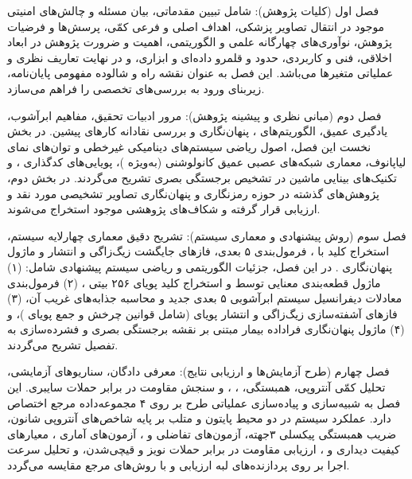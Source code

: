 فصل اول (کلیات پژوهش): شامل تبیین مقدماتی، بیان مسئله و چالش‌های امنیتی موجود در انتقال تصاویر پزشکی، اهداف اصلی و فرعی کمّی، پرسش‌ها و فرضیات پژوهش، نوآوری‌های چهارگانه علمی و الگوریتمی، اهمیت و ضرورت پژوهش در ابعاد اخلاقی، فنی و کاربردی، حدود و قلمرو داده‌ای و ابزاری، و در نهایت تعاریف نظری و عملیاتی متغیرها می‌باشد. این فصل به عنوان نقشه راه و شالوده مفهومی پایان‌نامه، زیربنای ورود به بررسی‌های تخصصی را فراهم می‌سازد.\par



فصل دوم (مبانی نظری و پیشینه پژوهش): مرور ادبیات تحقیق، مفاهیم ابرآشوب، یادگیری عمیق، الگوریتم‌های ، پنهان‌نگاری و بررسی نقادانه کارهای پیشین. در بخش نخست این فصل، اصول ریاضی سیستم‌های دینامیکی غیرخطی و توان‌های نمای لیاپانوف، معماری شبکه‌های عصبی عمیق کانولوشنی (به‌ویژه )، پویایی‌های کدگذاری ، و تکنیک‌های بینایی ماشین در تشخیص برجستگی بصری  تشریح می‌گردند. در بخش دوم، پژوهش‌های گذشته در حوزه رمزنگاری و پنهان‌نگاری تصاویر تشخیصی مورد نقد و ارزیابی قرار گرفته و شکاف‌های پژوهشی موجود استخراج می‌شوند.\par



فصل سوم (روش پیشنهادی و معماری سیستم): تشریح دقیق معماری چهارلایه سیستم، استخراج کلید با ، فرمول‌بندی ۵ بعدی، فازهای جایگشت زیگ‌زاگی و انتشار  و ماژول پنهان‌نگاری . در این فصل، جزئیات الگوریتمی و ریاضی سیستم پیشنهادی شامل: (۱) ماژول قطعه‌بندی معنایی  توسط  و استخراج کلید پویای ۲۵۶ بیتی ، (۲) فرمول‌بندی معادلات دیفرانسیل سیستم ابرآشوبی ۵ بعدی جدید و محاسبه جذابه‌های غریب آن، (۳) فازهای آشفته‌سازی زیگ‌زاگی  و انتشار پویای  (شامل قوانین چرخش و جمع پویای )، و (۴) ماژول پنهان‌نگاری فراداده بیمار مبتنی بر نقشه برجستگی بصری  و فشرده‌سازی  به تفصیل تشریح می‌گردند.\par



فصل چهارم (طرح آزمایش‌ها و ارزیابی نتایج): معرفی دادگان، سناریوهای آزمایشی، تحلیل کمّی آنتروپی، همبستگی، ، ،  و سنجش مقاومت در برابر حملات سایبری. این فصل به شبیه‌سازی و پیاده‌سازی عملیاتی طرح بر روی ۴ مجموعه‌داده مرجع  اختصاص دارد. عملکرد سیستم در دو محیط پایتون و متلب بر پایه شاخص‌های آنتروپی شانون، ضریب همبستگی پیکسلی ۳جهته، آزمون‌های تفاضلی  و ، آزمون‌های آماری ، معیارهای کیفیت دیداری  و ، ارزیابی مقاومت در برابر حملات نویز و قیچی‌شدن، و تحلیل سرعت اجرا بر روی پردازنده‌های لبه  ارزیابی و با روش‌های مرجع مقایسه می‌گردد.\par

